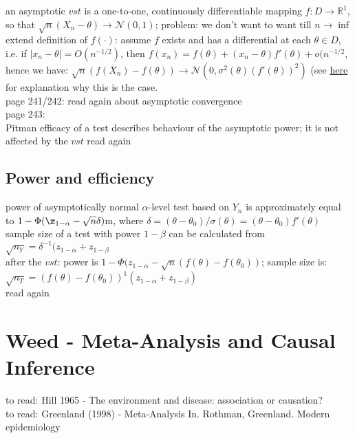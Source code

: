 an asymptotic $vst$ is a one-to-one, continuously differentiable mapping $f: D \rightarrow \mathbb{R}^1$, so that $\sqrt{n}(X_n - \theta) \rightarrow \mathcal{N}(0,1)$; problem: we don't want to want till $n \rightarrow \inf$\\

extend definition of $f(\cdot)$: assume $f$ exists and has a differential at each $\theta \in D$, i.e. if $|x_n - \theta| = O(n^{-1/2})$, then $f(x_n) = f(\theta) + (x_n - \theta)f'(\theta)+o(n^{-1/2}$, hence we have: $\sqrt{n}(f(X_n) - f(\theta)) \rightarrow \mathcal{N}(0,\sigma^2(\theta)(f'(\theta))^2)$ (see \href{https://stats.stackexchange.com/questions/5782/variance-of-a-function-of-one-random-variable}{here} for explanation why this is the case.\\

page 241/242: read again about asymptotic convergence\\

page 243:\\
Pitman efficacy of a test describes behaviour of the asymptotic power; it is not affected by the $vst$
read again\\

\subsection{Power and efficiency}
power of asymptotically normal $\alpha$-level test based on $Y_n$ is approximately equal to $1-\Phi(\z_{1-\alpha}-\sqrt{n}\delta)$m, where $\delta = (\theta-\theta_0)/\sigma(\theta)=(\theta-\theta_0) f'(\theta)$\\

sample size of a test with power $1-\beta$ can be calculated from $\sqrt{n_Y} = \delta^{-1}(z_{1-\alpha}+z_{1-\beta}$\\

after the $vst$: power is $1-\Phi(z_{1-\alpha}-\sqrt{n}(f(\theta)-f(\theta_0))$; sample size is: $\sqrt{n_T} = (f(\theta)-f(\theta_0))^1(z_{1-\alpha}+z_{1-\beta})$\\
read again

\section{Weed - Meta-Analysis and Causal Inference}
to read: Hill 1965 - The environment and disease: association or causation?\\

to read: Greenland (1998) - Meta-Analysis In. Rothman, Greenland. Modern epidemiology\\


